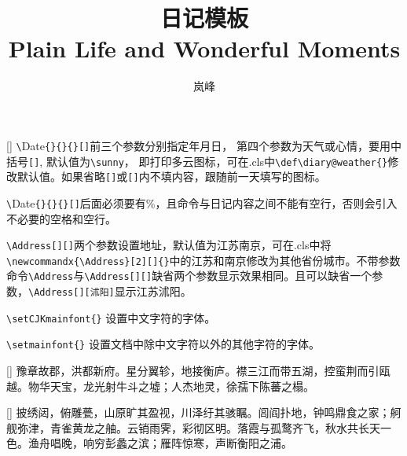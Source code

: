 \documentclass{diary}
\title{日记模板 \\{\small Plain Life and Wonderful Moments}}
\author{岚峰}
\begin{document}
\maketitle

\Address[中国][北京]
[\sun]%
\verb|\|Date\verb|{}{}{}[]|前三个参数分别指定年月日， 第四个参数为天气或心情，要用中括号\verb|[]|, 默认值为\verb|\sunny|， 即打印多云图标，可在.cls中\verb|\def\diary@weather{}|修改默认值。如果省略\verb|[]|或\verb|[]|内不填内容，跟随前一天填写的图标。

\verb|\|Date\verb|{}{}{}[]|后面必须要有\%，且命令与日记内容之间不能有空行，否则会引入不必要的空格和空行。

\verb|\Address[][]|两个参数设置地址，默认值为江苏南京，可在.cls中将
\verb|\newcommandx{\Address}[2][]{}|中的江苏和南京修改为其他省份城市。不带参数命令\verb|\Address|与\verb|\Address[][]|缺省两个参数显示效果相同。且可以缺省一个参数，\verb|\Address[][沭阳]|显示江苏沭阳。

\verb|\setCJKmainfont{}| 设置中文字符的字体。

\verb|\setmainfont{}| 设置文档中除中文字符以外的其他字符的字体。

\Address[][沭阳]
[]%
\Theme[滕王阁序]
豫章故郡，洪都新府。星分翼轸，地接衡庐。襟三江而带五湖，控蛮荆而引瓯越。物华天宝，龙光射牛斗之墟；人杰地灵，徐孺下陈蕃之榻。

\Address[][]
[\winkSmile]%
披绣闼，俯雕甍，山原旷其盈视，川泽纡其骇瞩。闾阎扑地，钟鸣鼎食之家；舸舰弥津，青雀黄龙之舳。云销雨霁，彩彻区明。落霞与孤鹜齐飞，秋水共长天一色。渔舟唱晚，响穷彭蠡之滨；雁阵惊寒，声断衡阳之浦。
\end{document}
